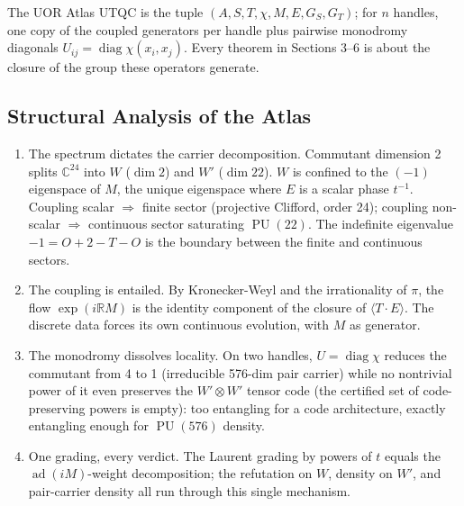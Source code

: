 The UOR Atlas UTQC is the tuple $(A, S, T, \chi, M, E, G_S, G_T)$; for $n$ handles, one copy of the coupled generators per handle plus pairwise monodromy diagonals $U_{ij} = \operatorname{diag} \chi(x_i, x_j)$. Every theorem in Sections 3--6 is about the closure of the group these operators generate.

\subsection{Structural Analysis of the Atlas}\label{sec:atlas_analysis}

\begin{enumerate}
    \item The spectrum dictates the carrier decomposition. Commutant dimension 2 splits $\mathbb{C}^{24}$ into $W$ ($\dim 2$) and $W'$ ($\dim 22$). $W$ is confined to the $(-1)$ eigenspace of $M$, the unique eigenspace where $E$ is a scalar phase $t^{-1}$. Coupling scalar $\Rightarrow$ finite sector (projective Clifford, order 24); coupling non-scalar $\Rightarrow$ continuous sector saturating $\operatorname{PU}(22)$. The indefinite eigenvalue $-1 = O+2-T-O$ is the boundary between the finite and continuous sectors.
    \item The coupling is entailed. By Kronecker-Weyl and the irrationality of $\pi$, the flow $\exp(i \mathbb{R} M)$ is the identity component of the closure of $\langle T \cdot E \rangle$. The discrete data forces its own continuous evolution, with $M$ as generator.
    \item The monodromy dissolves locality. On two handles, $U = \operatorname{diag} \chi$ reduces the commutant from 4 to 1 (irreducible 576-dim pair carrier) while no nontrivial power of it even preserves the $W' \otimes W'$ tensor code (the certified set of code-preserving powers is empty): too entangling for a code architecture, exactly entangling enough for $\operatorname{PU}(576)$ density.
    \item One grading, every verdict. The Laurent grading by powers of $t$ equals the $\operatorname{ad}(iM)$-weight decomposition; the refutation on $W$, density on $W'$, and pair-carrier density all run through this single mechanism.
\end{enumerate}

